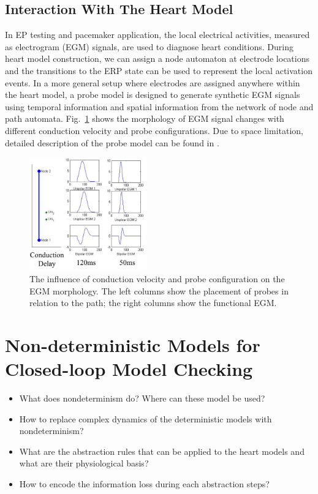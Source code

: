 \documentclass[openany]{now} %
\newcommand{\figref}[1]{Fig.~\ref{fig:#1}}
\begin{document}
\subsection{Interaction With The Heart Model}
In EP testing and pacemaker application, the local electrical activities, measured as electrogram (EGM) signals, are used to diagnose heart conditions. During heart model construction, we can assign a node automaton at electrode locations and the transitions to the ERP state can be used to represent the local activation events. In a more general setup where electrodes are assigned anywhere within the heart model, a probe model is designed to generate synthetic EGM signals using temporal information and spatial information from the network of node and path automata. \figref{egm} shows the morphology of EGM signal changes with different conduction velocity and probe configurations. Due to space limitation, detailed description of the probe model can be found in \cite{vhm_embc11}.

\begin{figure}[!t]
\center
		\includegraphics[width=0.45\textwidth]{figs/fig7.png}
\caption{The influence of conduction velocity and probe configuration on the EGM morphology. The left columns show the placement of probes in relation to the path; the right columns show the functional EGM.}
\label{fig:egm}
\end{figure}

\section{Non-deterministic Models for Closed-loop Model Checking}
\begin{itemize}
	\item What does nondeterminism do? Where can these model be used?
    \item How to replace complex dynamics of the deterministic models with nondeterminism?
    \item What are the abstraction rules that can be applied to the heart models and what are their physiological basis?
    \item How to encode the information loss during each abstraction steps?
\end{itemize}
\end{document}
